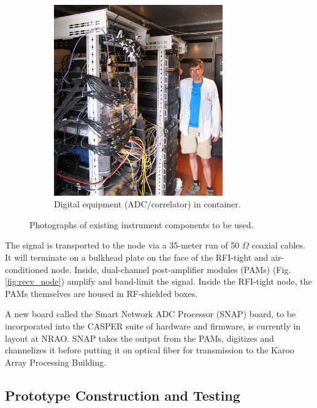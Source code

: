 \documentclass[preprint]{aastex}
\begin{document}
\begin{figure}[h]
\begin{subfigure}[b]{0.3\textwidth}
		\includegraphics[width=0.8\textwidth]{plots/Engineering/digital.png}
		\caption{Digital equipment (ADC/correlator) in container.}
		\label{fig:digital} 
	\end{subfigure}
	\caption{Photographs of existing instrument components to be used.}
\end{figure}

The signal is transported to the node via a 35-meter run of 50 $\Omega$ coaxial
cables. It will terminate on a bulkhead plate on the face of the RFI-tight and
air-conditioned node. Inside, dual-channel post-amplifier modules (PAMs) (Fig.
\ref{fig:recv_node}) amplify and band-limit the signal. Inside the RFI-tight node,
the PAMs themselves are housed in RF-shielded boxes.

A new board called the Smart Network ADC Processor (SNAP) board, to be incorporated 
into the CASPER suite of hardware and firmware, is currently in layout at NRAO.  SNAP
takes the output from the PAMs, digitizes and channelizes it before putting it on optical fiber
for transmission to the Karoo Array Processing Building.

\vspace{-0.25in}
\subsection{Prototype Construction and Testing}
\vspace{-6pt}
\end{document}
